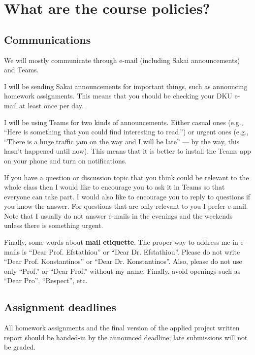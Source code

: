 \documentclass[11pt]{article}
\begin{document}

\section{What are the course policies?}

\subsection{Communications}

We will mostly communicate through e-mail (including Sakai announcements) and Teams.

I will be sending Sakai announcements for important things, such as announcing homework assignments. This means that you should be checking your DKU e-mail at least once per day.

I will be using Teams for two kinds of announcements. Either casual ones (e.g., ``Here is something that you could find interesting to read.'') or urgent ones (e.g., ``There is a huge traffic jam on the way and I will be late'' --- by the way, this hasn't happened until now). This means that it is better to install the Teams app on your phone and turn on notifications.

If you have a question or discussion topic that you think could be relevant to the whole class then I would like to encourage you to ask it in Teams so that everyone can take part.
I would also like to encourage you to reply to questions if you know the answer.
For questions that are only relevant to you I prefer e-mail. 
Note that I usually do not answer e-mails in the evenings and the weekends unless there is something urgent.

Finally, some words about \textbf{mail etiquette}. The proper way to address me in e-mails is ``Dear Prof. Efstathiou'' or ``Dear Dr. Efstathiou''. Please do not write ``Dear Prof. Konstantinos'' or ``Dear Dr. Konstantinos''. Also, please do not use only ``Prof.'' or ``Dear Prof.'' without my name.  Finally, avoid openings such as ``Dear Pro'', ``Respect'', etc.



\subsection{Assignment deadlines}

All homework assignments and the final version of the applied project written report should be handed-in by the announced deadline; late submissions will not be graded. 
\end{document}
